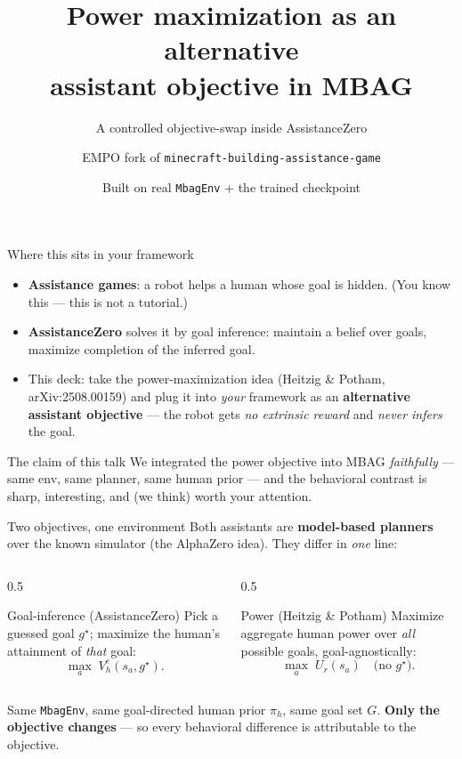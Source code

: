 \documentclass[aspectratio=169,10pt]{beamer}
\title{Power maximization as an alternative \\ assistant objective in MBAG}
\subtitle{A controlled objective-swap inside AssistanceZero}
\author{EMPO fork of \texttt{minecraft-building-assistance-game}}
\date{Built on real \texttt{MbagEnv} + the trained checkpoint}
\newcommand{\Power}[1]{\textcolor{cPower}{#1}}
\newcommand{\Goal}[1]{\textcolor{cGoal}{#1}}
\newcommand{\Veh}{V^{e}_{h}}
\begin{document}
\maketitle

\begin{frame}{Where this sits in your framework}
  \begin{itemize}
    \item \textbf{Assistance games}: a robot helps a human whose goal is hidden.
      (You know this --- this is not a tutorial.)
    \item \textbf{AssistanceZero} solves it by \Goal{goal inference}: maintain a
      belief over goals, maximize completion of the inferred goal.
    \item This deck: take the \Power{power-maximization} idea
      (Heitzig \& Potham, arXiv:2508.00159) and plug it into \emph{your}
      framework as an \textbf{alternative assistant objective} --- the robot
      gets \emph{no extrinsic reward} and \emph{never infers} the goal.
  \end{itemize}
  \vfill
  \begin{alertblock}{The claim of this talk}
    We integrated the power objective into MBAG \emph{faithfully} --- same env,
    same planner, same human prior --- and the behavioral contrast is sharp,
    interesting, and (we think) worth your attention.
  \end{alertblock}
\end{frame}

\begin{frame}{Two objectives, one environment}
  Both assistants are \textbf{model-based planners} over the known simulator
  (the AlphaZero idea). They differ in \emph{one} line:
  \vfill
  \begin{columns}[T]
    \begin{column}{0.5\textwidth}
      \begin{block}{\Goal{Goal-inference} (AssistanceZero)}
        Pick a guessed goal $g^\star$; maximize the human's attainment of
        \emph{that} goal:
        \[ \max_{a}\; \Veh(s_a, g^\star). \]
      \end{block}
    \end{column}
    \begin{column}{0.5\textwidth}
      \begin{block}{\Power{Power} (Heitzig \& Potham)}
        Maximize aggregate human power over \emph{all} possible goals,
        goal-agnostically:
        \[ \max_{a}\; U_r(s_a) \quad\text{(no $g^\star$).} \]
      \end{block}
    \end{column}
  \end{columns}
  \vfill
  \footnotesize Same \texttt{MbagEnv}, same goal-directed human prior
  $\pi_h$, same goal set $G$. \textbf{Only the objective changes} --- so every
  behavioral difference is attributable to the objective.
\end{frame}
\end{document}
